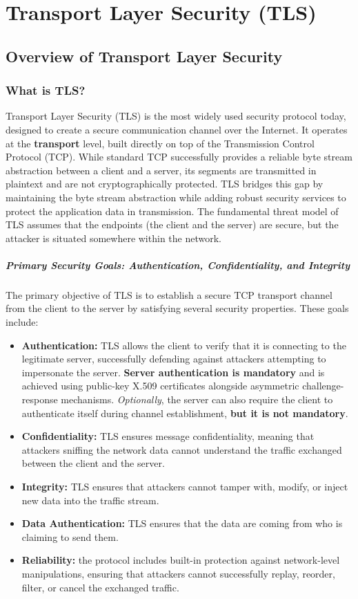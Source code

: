\chapter[]{Transport Layer Security (TLS)}

\section{Overview of Transport Layer Security}
\subsection{What is TLS?}
Transport Layer Security (TLS) is the most widely used security protocol today, designed to create a secure communication channel over the Internet. It operates at the \textbf{transport} level, built directly on top of the Transmission Control Protocol (TCP). While standard TCP successfully provides a reliable byte stream abstraction between a client and a server, its segments are transmitted in plaintext and are not cryptographically protected. TLS bridges this gap by maintaining the byte stream abstraction while adding robust security services to protect the application data in transmission. The fundamental threat model of TLS assumes that the endpoints (the client and the server) are secure, but the attacker is situated somewhere within the network.

\paragraph{Primary Security Goals: Authentication, Confidentiality, and Integrity}
The primary objective of TLS is to establish a secure TCP transport channel from the client to the server by satisfying several security properties. These goals include:
\begin{itemize}
    \item \textbf{Authentication:} TLS allows the client to verify that it is connecting to the legitimate server, successfully defending against attackers attempting to impersonate the server. \textbf{Server authentication is mandatory} and is achieved using public-key X.509 certificates alongside asymmetric challenge-response mechanisms. \textit{Optionally}, the server can also require the client to authenticate itself during channel establishment, \textbf{but it is not mandatory}.
    \item \textbf{Confidentiality:} TLS ensures message confidentiality, meaning that attackers sniffing the network data cannot understand the traffic exchanged between the client and the server.
    \item \textbf{Integrity:} TLS ensures that attackers cannot tamper with, modify, or inject new data into the traffic stream.
    \item \textbf{Data Authentication:} TLS ensures that the data are coming from who is claiming to send them.
    \item \textbf{Reliability:} the protocol includes built-in protection against network-level manipulations, ensuring that attackers cannot successfully replay, reorder, filter, or cancel the exchanged traffic.
\end{itemize}

